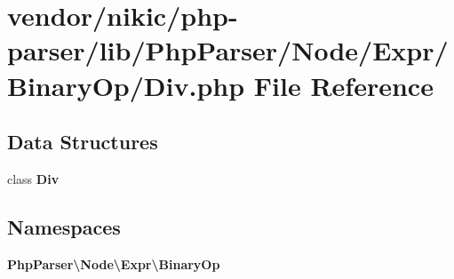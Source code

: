 \section{vendor/nikic/php-\/parser/lib/\+Php\+Parser/\+Node/\+Expr/\+Binary\+Op/\+Div.php File Reference}
\label{_binary_op_2_div_8php}
\subsection*{Data Structures}
\begin{DoxyCompactItemize}
\item 
class {\bf Div}
\end{DoxyCompactItemize}
\subsection*{Namespaces}
\begin{DoxyCompactItemize}
\item 
 {\bf Php\+Parser\textbackslash{}\+Node\textbackslash{}\+Expr\textbackslash{}\+Binary\+Op}
\end{DoxyCompactItemize}
